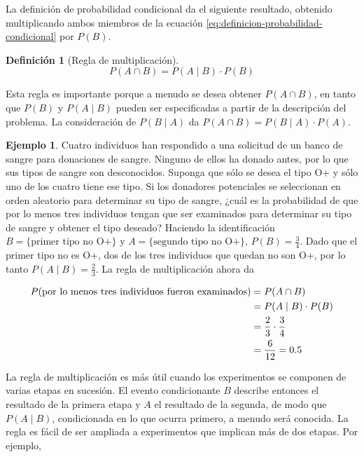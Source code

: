 \documentclass[
  11pt,
]{book}
\theoremstyle{definition}
\newtheorem{definition}{Definición}[chapter]
\theoremstyle{definition}
\newtheorem{example}{Ejemplo}[chapter]
\theoremstyle{definition}
\theoremstyle{definition}
\theoremstyle{remark}
\begin{document}
La definición de probabilidad condicional da el siguiente resultado, obtenido multiplicando ambos miembros de la ecuación \eqref{eq:definicion-probabilidad-condicional} por \(P(B)\). \citep[página 69]{Devore}

\begin{definition}[Regla de multiplicación]
\[
P(A \cap B) = P(A \mid B) \cdot P(B)
\]
\end{definition}

Esta regla es importante porque a menudo se desea obtener \(P(A \cap B)\), en tanto que \(P(B)\) y \(P(A \mid B)\) pueden ser especificadas a partir de la descripción del problema. La consideración de \(P(B \mid A)\) da \(P(A \cap B) = P(B \mid A) \cdot P(A)\).

\begin{example}
\protect\hypertarget{exm:ejemplo-tipo-de-sangre}{}\label{exm:ejemplo-tipo-de-sangre}Cuatro individuos han respondido a una solicitud de un banco de sangre para donaciones de sangre. Ninguno de ellos ha donado antes, por lo que sus tipos de sangre son desconocidos. Suponga que sólo se desea el tipo O+ y sólo uno de los cuatro tiene ese tipo. Si los donadores potenciales se seleccionan en orden aleatorio para determinar su tipo de sangre, ¿cuál es la probabilidad de que por lo menos tres individuos tengan que ser examinados para determinar su tipo de sangre y obtener el tipo deseado? Haciendo la identificación \(B = \{\text{primer tipo no O+}\}\) y \(A = \{\text{segundo tipo no O+}\}\), \(P(B) = \frac{3}{4}\). Dado que el primer tipo no es O+, dos de los tres individuos que quedan no son O+, por lo tanto \(P(A \mid B) = \frac{2}{3}\). La regla de multiplicación ahora da

\begin{equation}
\notag
\begin{split}
P(\text{por lo menos tres individuos fueron examinados}) &= P(A \cap B)\\
&= P(A \mid B) \cdot P(B)\\
& = \frac{2}{3} \cdot \frac{3}{4}\\
&= \frac{6}{12} = 0.5
\end{split}
\end{equation}

La regla de multiplicación es más útil cuando los experimentos se componen de varias etapas en sucesión. El evento condicionante \(B\) describe entonces el resultado de la primera etapa y \(A\) el resultado de la segunda, de modo que \(P(A \mid B)\), condicionada en lo que ocurra primero, a menudo será conocida. La regla es fácil de ser ampliada a experimentos que implican más de dos etapas. Por ejemplo,


\end{example}
\end{document}
